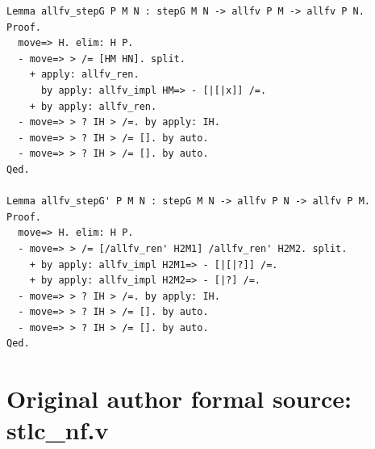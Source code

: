 \begin{lstlisting}[style=authorcoq]
Lemma allfv_stepG P M N : stepG M N -> allfv P M -> allfv P N.
Proof.
  move=> H. elim: H P.
  - move=> > /= [HM HN]. split.
    + apply: allfv_ren.
      by apply: allfv_impl HM=> - [|[|x]] /=.
    + by apply: allfv_ren.
  - move=> > ? IH > /=. by apply: IH.
  - move=> > ? IH > /= []. by auto.
  - move=> > ? IH > /= []. by auto.
Qed.

Lemma allfv_stepG' P M N : stepG M N -> allfv P N -> allfv P M.
Proof.
  move=> H. elim: H P.
  - move=> > /= [/allfv_ren' H2M1] /allfv_ren' H2M2. split.
    + by apply: allfv_impl H2M1=> - [|[|?]] /=.
    + by apply: allfv_impl H2M2=> - [|?] /=.
  - move=> > ? IH > /=. by apply: IH.
  - move=> > ? IH > /= []. by auto.
  - move=> > ? IH > /= []. by auto.
Qed.
\end{lstlisting}
\clearpage
\section*{Original author formal source: stlc\_nf.v}
